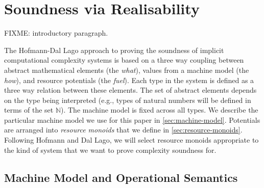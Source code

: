 \documentclass[acmsmall,review]{acmart}
\begin{document}
\section{Soundness via Realisability}
\label{sec:soundness}

\newcommand{\cstaccess}{c_{\mathit{access}}}
\newcommand{\cstmkclo}{c_{\mathit{mkclo}}}
\newcommand{\cstapp}{c_{\mathit{app}}}
\newcommand{\cstmkpair}{c_{\mathit{mkpair}}}
\newcommand{\cstmkunit}{c_{\mathit{mkunit}}}
\newcommand{\cstTrue}{c_{\mathit{mktrue}}}
\newcommand{\cstFalse}{c_{\mathit{mkfalse}}}
\newcommand{\cstLetpair}{c_{\mathit{letpair}}}
\newcommand{\cstSeq}{c_{\mathit{seq}}}
\newcommand{\cstIf}{c_{\mathit{if}}}

\newcommand{\clo}[2]{\mathsf{clo}\langle #1 , #2 \rangle}
\newcommand{\synTrue}{\mathsf{true}}
\newcommand{\synFalse}{\mathsf{false}}

\newcommand{\ExpSet}{\mathcal{E}}
\newcommand{\ValSet}{\mathcal{V}}

\newcommand{\rplus}{\oplus}
\newcommand{\rzero}{\emptyset}

FIXME: introductory paragraph.

The Hofmann-Dal Lago approach to proving the soundness of implicit
computational complexity systems is based on a three way coupling
between abstract mathematical elements (the \emph{what}), values from
a machine model (the \emph{how}), and resource potentials (the
\emph{fuel}). Each type in the system is defined as a three way
relation between these elements. The set of abstract elements depends
on the type being interpreted (e.g., types of natural numbers will be
defined in terms of the set $\mathbb{N}$). The machine model is fixed
across all types. We describe the particular machine model we use for
this paper in \autoref{sec:machine-model}. Potentials are arranged
into \emph{resource monoids} that we define in
\autoref{sec:resource-monoids}. Following Hofmann and Dal Lago, we
will select resource monoids appropriate to the kind of system that we
want to prove complexity soundness for.

\subsection{Machine Model and Operational Semantics}
\label{sec:machine-model}
\end{document}
